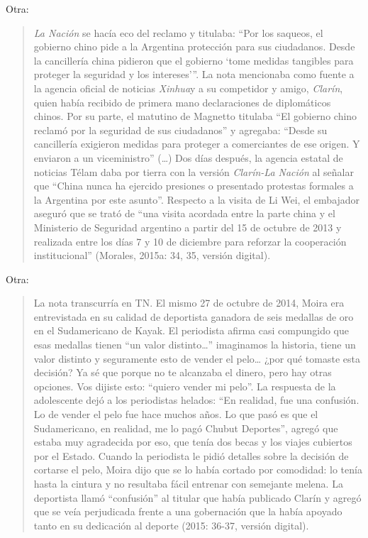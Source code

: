 Otra:

\begin{quote}
\emph{La Nación} se hacía eco del reclamo y titulaba: \enquote{Por los saqueos, el gobierno chino pide a la Argentina protección para sus ciudadanos. Desde la cancillería china pidieron que el gobierno \enquote{tome medidas tangibles para proteger la seguridad y los intereses}}. La nota mencionaba como fuente a la agencia oficial de noticias \emph{Xinhua}y a su competidor y amigo, \emph{Clarín}, quien había recibido de primera mano declaraciones de diplomáticos chinos. Por su parte, el matutino de Magnetto titulaba \enquote{El gobierno chino reclamó por la seguridad de sus ciudadanos} y agregaba: \enquote{Desde su cancillería exigieron medidas para proteger a comerciantes de ese origen. Y enviaron a un viceministro} (\ldots) Dos días después, la agencia estatal de noticias Télam daba por tierra con la versión \emph{Clarín-La Nación} al señalar que \enquote{China nunca ha ejercido presiones o presentado protestas formales a la Argentina por este asunto}. Respecto a la visita de Li Wei, el embajador aseguró que se trató de \enquote{una visita acordada entre la parte china y el Ministerio de Seguridad argentino a partir del 15 de octubre de 2013 y realizada entre los días 7 y 10 de diciembre para reforzar la cooperación institucional} (Morales, 2015a: 34, 35, versión digital).
\end{quote}

Otra:

\begin{quote}
La nota transcurría en TN. El mismo 27 de octubre de 2014, Moira era entrevistada en su calidad de deportista ganadora de seis medallas de oro en el Sudamericano de Kayak. El periodista afirma casi compungido que esas medallas tienen \enquote{un valor distinto\ldots{}} imaginamos la historia, tiene un valor distinto y seguramente esto de vender el pelo\ldots{} ¿por qué tomaste esta decisión? Ya sé que porque no te alcanzaba el dinero, pero hay otras opciones. Vos dijiste esto: \enquote{quiero vender mi pelo}. La respuesta de la adolescente dejó a los periodistas helados: \enquote{En realidad, fue una confusión. Lo de vender el pelo fue hace muchos años. Lo que pasó es que el Sudamericano, en realidad, me lo pagó Chubut Deportes}, agregó que estaba muy agradecida por eso, que tenía dos becas y los viajes cubiertos por el Estado. Cuando la periodista le pidió detalles sobre la decisión de cortarse el pelo, Moira dijo que se lo había cortado por comodidad: lo tenía hasta la cintura y no resultaba fácil entrenar con semejante melena. La deportista llamó \enquote{confusión} al titular que había publicado Clarín y agregó que se veía perjudicada frente a una gobernación que la había apoyado tanto en su dedicación al deporte (2015: 36-37, versión digital).
\end{quote}

